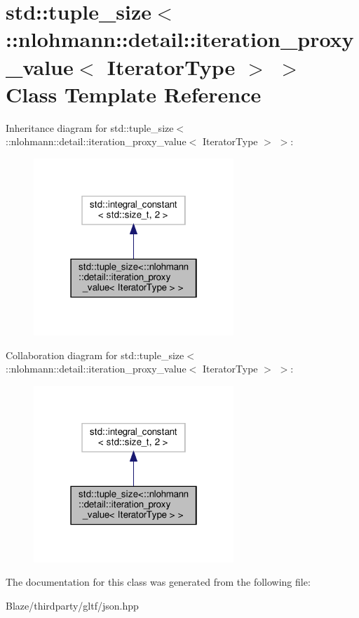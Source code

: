 \hypertarget{classstd_1_1tuple__size_3_1_1nlohmann_1_1detail_1_1iteration__proxy__value_3_01IteratorType_01_4_01_4}{}\section{std\+:\+:tuple\+\_\+size$<$\+:\+:nlohmann\+:\+:detail\+:\+:iteration\+\_\+proxy\+\_\+value$<$ Iterator\+Type $>$ $>$ Class Template Reference}
\label{classstd_1_1tuple__size_3_1_1nlohmann_1_1detail_1_1iteration__proxy__value_3_01IteratorType_01_4_01_4}


Inheritance diagram for std\+:\+:tuple\+\_\+size$<$\+:\+:nlohmann\+:\+:detail\+:\+:iteration\+\_\+proxy\+\_\+value$<$ Iterator\+Type $>$ $>$\+:\nopagebreak
\begin{figure}[H]
\begin{center}
\leavevmode
\includegraphics[width=214pt]{classstd_1_1tuple__size_3_1_1nlohmann_1_1detail_1_1iteration__proxy__value_3_01IteratorType_01_4_01_4__inherit__graph}
\end{center}
\end{figure}


Collaboration diagram for std\+:\+:tuple\+\_\+size$<$\+:\+:nlohmann\+:\+:detail\+:\+:iteration\+\_\+proxy\+\_\+value$<$ Iterator\+Type $>$ $>$\+:\nopagebreak
\begin{figure}[H]
\begin{center}
\leavevmode
\includegraphics[width=214pt]{classstd_1_1tuple__size_3_1_1nlohmann_1_1detail_1_1iteration__proxy__value_3_01IteratorType_01_4_01_4__coll__graph}
\end{center}
\end{figure}


The documentation for this class was generated from the following file\+:\begin{DoxyCompactItemize}
\item 
Blaze/thirdparty/gltf/json.\+hpp\end{DoxyCompactItemize}
